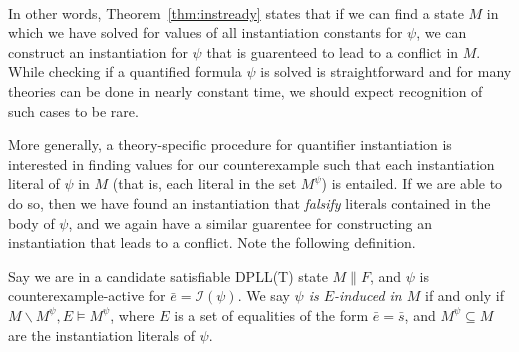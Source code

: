 \documentclass{llncs}
\newtheorem{cor}{Corollary}
\begin{document}
\ \\ 

\begin{comment}
\begin{cor}
\label{cor:instready}
Given a candidate-satisifiable DPLL(T) state $M \parallel F$, for all quantified formula $\psi \in M$,
if $\psi$ is counterexample-active in $M \parallel F$ and solved in $M$, then the instantiation clause $( \neg \psi$ $\vee$ $\varphi[rep_M( \bar{e} )/\bar{x}])$ has not been added to $F$.
\end{cor}
\begin{proof}
The proof is immediate, noting that by Theorem~\ref{thm:instready}, $( \neg \psi \vee \varphi[rep_M( \bar{e} )/\bar{x}])$ is $T$-unsatisifiable in $M$, and therefore cannot be satisfied in $M \parallel F$. $\Box$
\end{proof}
Corollary~\ref{cor:instready} states that if we can find such an instantiation, then it has not yet been applied.
This fact guarentees that no redundant instantiations are used in certain instantiation schemes.
\end{comment}

In other words, Theorem~\ref{thm:instready} states that if we can find a state $M$ in which we have solved for values of all instantiation constants for $\psi$, we can construct an instantiation for $\psi$ that is guarenteed to lead to a conflict in $M$.
While checking if a quantified formula $\psi$ is solved is straightforward and for many theories can be done in nearly constant time, we should expect recognition of such cases to be rare.

More generally, a theory-specific procedure for quantifier instantiation is interested in finding values for our counterexample such that each instantiation literal of $\psi$ in $M$ (that is, each literal in the set $M^\psi$) is entailed.
If we are able to do so, then we have found an instantiation that \emph{falsify} literals contained in the body of $\psi$, and we again have a similar guarentee for constructing an instantiation that leads to a conflict.
Note the following definition.

\begin{definition}[E-induced]
Say we are in a candidate satisfiable DPLL(T) state $M \parallel F$, and $\psi$ is counterexample-active for $\bar{e} = \mathcal{I}( \psi )$.
We say \emph{$\psi$ is $E$-induced in $M$} if and only if $M \backslash M^\psi, E \models M^\psi$, where $E$ is a set of equalities of the form $\bar{e} = \bar{s}$, and $M^\psi \subseteq M$ are the instantiation literals of $\psi$.
\end{definition}
\end{document}
